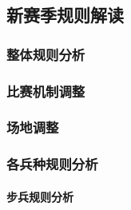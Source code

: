\subsection{新赛季规则解读}

    \subsubsection{整体规则分析}

    \subsubsection{比赛机制调整}

    \subsubsection{场地调整}

    \subsubsection{各兵种规则分析}

        \paragraph{步兵规则分析}

    

